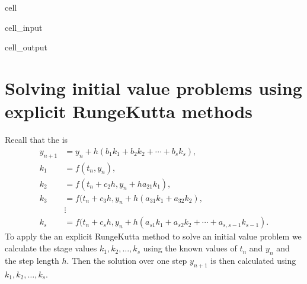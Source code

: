 \documentclass[letterpaper,10pt,english]{jupyterBook}
\begin{document}
\begin{sphinxuseclass}{cell}
\begin{sphinxVerbatimInput}
\begin{sphinxuseclass}{cell_input}
\end{sphinxuseclass}\end{sphinxVerbatimInput}
\begin{sphinxVerbatimOutput}

\begin{sphinxuseclass}{cell_output}
\noindent{}

\end{sphinxuseclass}\end{sphinxVerbatimOutput}

\end{sphinxuseclass}
\sphinxstepscope


\section{Solving initial value problems using explicit Runge\sphinxhyphen{}Kutta methods}
\label{\detokenize{2_ERKs/2.3_Solving_IVPs_using_ERK_methods:solving-initial-value-problems-using-explicit-runge-kutta-methods}}\label{\detokenize{2_ERKs/2.3_Solving_IVPs_using_ERK_methods:applying-erk-methods-to-solve-ivps-section}}\label{\detokenize{2_ERKs/2.3_Solving_IVPs_using_ERK_methods::doc}}
\sphinxAtStartPar
Recall that the {\hyperref[\detokenize{2_ERKs/2.0_ERKs:general-form-of-a-rk-method-section}]{}} is
\begin{align*}
    y_{n+1} &= y_n + h(b_1k_1 + b_2k_2 + \cdots + b_sk_s), \\
    k_1 &= f(t_n, y_n), \\
    k_2 &= f(t_n + c_2h, y_n + ha_{21}k_1), \\
    k_3 &= f(t_n + c_3h, y_n + h(a_{31}k_1 + a_{32}k_2), \\
    &\vdots \\
    k_s &= f(t_n + c_sh, y_n + h(a_{s1}k_1 + a_{s2}k_2 + \cdots + a_{s,s-1}k_{s-1}).
\end{align*}
\sphinxAtStartPar
To apply the an explicit Runge\sphinxhyphen{}Kutta method to solve an initial value problem we calculate the stage values \(k_1, k_2, \dots, k_s\) using the known values of \(t_n\) and \(y_n\) and the step length \(h\). Then the solution over one step \(y_{n+1}\) is then calculated using \(k_1, k_2, \ldots, k_s\).
\end{document}
